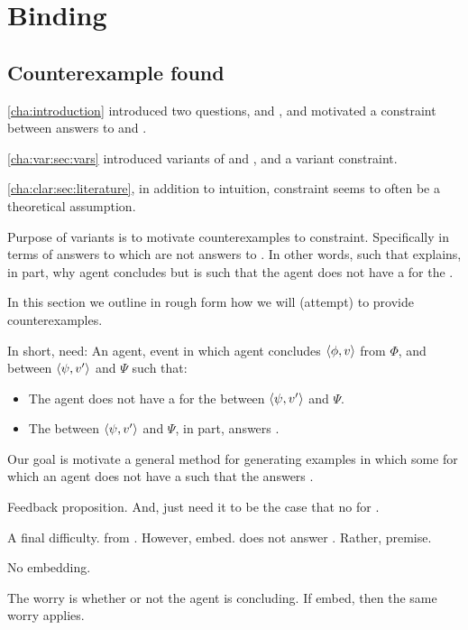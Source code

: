 \chapter{Binding}
\label{cha:binding}

\section{Counterexample found}
\label{sec:counterexample-found}

\begin{note}
  \autoref{cha:introduction} introduced two questions, \qWhy{} and \qHow{}, and motivated a constraint between answers to \qWhy{} and \qHow{}.

  \autoref{cha:var:sec:vars} introduced variants of \qWhy{} and \qHow{}, and a variant constraint.

  \autoref{cha:clar:sec:literature}, in addition to intuition, constraint seems to often be a theoretical assumption.

  Purpose of variants is to motivate counterexamples to constraint.
  Specifically in terms of answers to \qWhyV{} which are not answers to \qHowV{}.
  In other words, \ros{} such that \ros{} explains, in part, why agent concludes but is such that the agent does not have a \wit{} for the \ros{}.

  In this section we outline in rough form how we will (attempt) to provide counterexamples.

  In short, need:
  An agent, event in which agent concludes \(\langle \phi, v \rangle\) from \(\Phi\), and \ros{} between \(\langle \psi, v' \rangle\) and \(\Psi\) such that:

  \begin{itemize}
  \item
    The agent does not have a \wit{} for the \ros{} between \(\langle \psi, v' \rangle\) and \(\Psi\).
  \item
    The \ros{} between \(\langle \psi, v' \rangle\) and \(\Psi\), in part, answers \qWhyV{}.
  \end{itemize}

  Our goal is motivate a general method for generating examples in which some \ros{} for which an agent does not have a \wit{} such that the \ros{} answers \qWhyV{}.
\end{note}


\begin{note}
  Feedback proposition.
  And, just need it to be the case that no \wit{} for \fc{}.

  A final difficulty.
  \fc{} from \agpe{}.
  However, embed.
  \ros{} does not answer \qWhyV{}.
  Rather, premise.

  \begin{proposition}
    No embedding.
    \begin{argument}
      The worry is whether or not the agent is concluding.
      If embed, then the same worry applies.
    \end{argument}
  \end{proposition}
\end{note}

